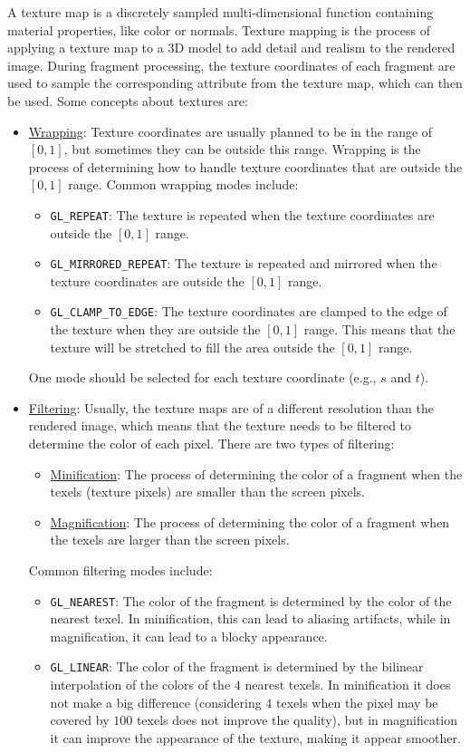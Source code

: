 A texture map is a discretely sampled multi-dimensional function containing material properties, like color or normals. Texture mapping is the process of applying a texture map to a 3D model to add detail and realism to the rendered image. During fragment processing, the texture coordinates of each fragment are used to sample the corresponding attribute from the texture map, which can then be used. Some concepts about textures are:
\begin{itemize}
    \item \ul{Wrapping}: Texture coordinates are usually planned to be in the range of $[0, 1]$, but sometimes they can be outside this range. Wrapping is the process of determining how to handle texture coordinates that are outside the $[0, 1]$ range. Common wrapping modes include:
    \begin{itemize}
        \item \texttt{GL\_REPEAT}: The texture is repeated when the texture coordinates are outside the $[0, 1]$ range.
        \item \texttt{GL\_MIRRORED\_REPEAT}: The texture is repeated and mirrored when the texture coordinates are outside the $[0, 1]$ range.
        \item \texttt{GL\_CLAMP\_TO\_EDGE}: The texture coordinates are clamped to the edge of the texture when they are outside the $[0, 1]$ range. This means that the texture will be stretched to fill the area outside the $[0, 1]$ range.
    \end{itemize}
    One mode should be selected for each texture coordinate (e.g., $s$ and $t$).
    \item \ul{Filtering}: Usually, the texture maps are of a different resolution than the rendered image, which means that the texture needs to be filtered to determine the color of each pixel. There are two types of filtering:
    \begin{itemize}
        \item \ul{Minification}: The process of determining the color of a fragment when the texels (texture pixels) are smaller than the screen pixels.
        \item \ul{Magnification}: The process of determining the color of a fragment when the texels are larger than the screen pixels.
    \end{itemize}

    Common filtering modes include:
    \begin{itemize}
        \item \texttt{GL\_NEAREST}: The color of the fragment is determined by the color of the nearest texel. In minification, this can lead to aliasing artifacts, while in magnification, it can lead to a blocky appearance.
        \item \texttt{GL\_LINEAR}: The color of the fragment is determined by the bilinear interpolation of the colors of the $4$ nearest texels. In minification it does not make a big difference (considering $4$ texels when the pixel may be covered by $100$ texels does not improve the quality), but in magnification it can improve the appearance of the texture, making it appear smoother.
        

\end{itemize}
\end{itemize}
